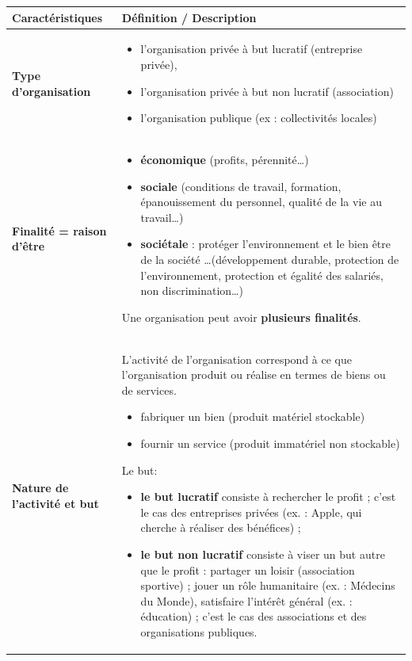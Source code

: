 \documentclass[pfe]{tnreport} %
\begin{document}
\begin{table}
\centering
\begin{tabular}{|p{4cm}|p{13cm}|}
\hline
\textbf{Caractéristiques} & \textbf{Définition / Description} \\
\hline

\textbf{Type d’organisation} &
\begin{itemize}
 \item l’organisation privée à but lucratif (entreprise privée),
 \item l’organisation privée à but non lucratif (association)
 \item l’organisation publique (ex : collectivités locales)
\end{itemize} \\
\hline

\textbf{Finalité = raison d’être} &
\begin{itemize}
 \item \textbf{économique} (profits, pérennité\ldots)
 \item \textbf{sociale} (conditions de travail, formation, épanouissement du personnel, qualité de la vie au travail\ldots)
 \item \textbf{sociétale} : protéger l’environnement et le bien être de la société \ldots (développement durable, protection de l’environnement, protection et égalité des salariés, non discrimination\ldots)
\end{itemize}

Une organisation peut avoir \textbf{plusieurs finalités}. \\
\hline

\textbf{Nature de l’activité et but} &
L’activité de l’organisation correspond à ce que l’organisation produit ou réalise en termes de biens ou de services.
\begin{itemize}
 \item fabriquer un bien (produit matériel stockable)
 \item fournir un service (produit immatériel non stockable)
\end{itemize}

Le but:
\begin{itemize}
 \item \textbf{le but lucratif} consiste à rechercher le profit ; c’est le cas des entreprises privées 
(ex. : Apple, qui cherche à réaliser des bénéfices) ; 
 \item \textbf{le but non lucratif} consiste à viser un but autre que le profit : partager un loisir (association sportive) ; jouer un rôle humanitaire (ex. : Médecins du Monde), satisfaire l’intérêt général (ex. : éducation) ; c’est le cas des associations et des organisations publiques.
\end{itemize} \\
\hline


\end{tabular}
\end{table}
\end{document}

